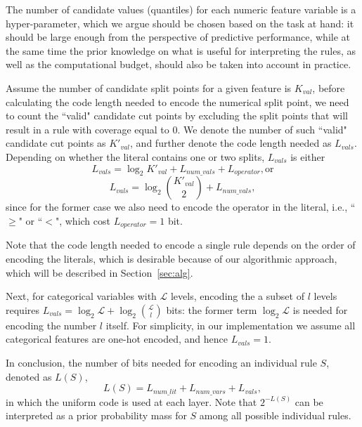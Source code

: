 The number of candidate values (quantiles) for each numeric feature variable is a hyper-parameter, which we argue should be chosen based on the task at hand: it should be large enough from the perspective of predictive performance, while at the same time the prior knowledge on what is useful for interpreting the rules, as well as the computational budget, should also be taken into account in practice. 

Assume the number of candidate split points for a given feature is $K_{val}$, before calculating the code length needed to encode the numerical split point, we need to count the ``valid" candidate cut points by excluding the split points that will result in a rule with coverage equal to 0. We denote the number of such ``valid" candidate cut points as $K'_{val}$, and further denote the code length needed as $L_{vals}$. Depending on whether the literal contains one or two splits, $L_{vals}$ is either
\begin{equation} \label{eq:l_val_1}
	L_{vals} = \log_2 {K'_{val}} + L_{num\_vals} + L_{operator}, \text{or}
\end{equation}
\begin{equation}
	L_{vals} = \log_2 {K'_{val} \choose 2} + L_{num\_vals}, 
\end{equation}
since for the former case we also need to encode the operator in the literal, i.e., ``$\geq$" or ``$<$", which cost $L_{operator} = 1$ bit. 

Note that the code length needed to encode a single rule depends on the order of encoding the literals, which is desirable because of our algorithmic approach, which will be described in Section~\ref{sec:alg}.

Next, for categorical variables with $\mathcal{L}$ levels, encoding the a subset of $l$ levels requires $L_{vals} =\log_2 \mathcal{L} + \log_2 {\mathcal{L} \choose l}$ bits: the former term $\log_2 \mathcal{L}$ is needed for encoding the number $l$ itself. For simplicity, in our implementation we assume all categorical features are one-hot encoded, and hence $L_{vals} = 1$. 

In conclusion, the number of bits needed for encoding an individual rule $S$, denoted as $L(S)$,
\begin{equation}
	L(S) = L_{num\_lit} + L_{num\_vars} + L_{vals}, 
\end{equation}
in which the uniform code is used at each layer. Note that $2^{-L(S)}$ can be interpreted as a prior probability mass for $S$ among all possible individual rules. 

